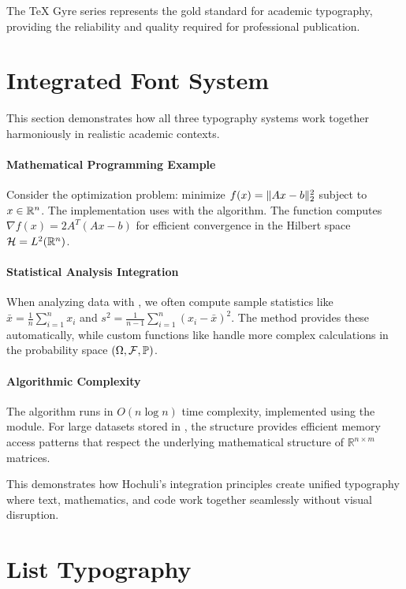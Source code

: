 \documentclass[11pt]{article}
\begin{document}
The TeX Gyre series represents the gold standard for academic typography, providing the reliability and quality required for professional publication.

\section{Integrated Font System}

This section demonstrates how all three typography systems work together harmoniously in realistic academic contexts.

\paragraph{Mathematical Programming Example} Consider the optimization problem: minimize $f(x) = \lVert Ax - b\rVert_2^2$ subject to $x \in \mathbb{R}^n$. 
The implementation uses  with the  algorithm.
The  function computes $\nabla f(x) = 2A^T(Ax - b)$ for efficient convergence in the Hilbert space $\mathcal{H} = L^2(\mathbb{R}^n)$.

\paragraph{Statistical Analysis Integration} When analyzing data with , we often compute sample statistics like $\bar{x} = \frac{1}{n}\sum_{i=1}^n x_i$ and $s^2 = \frac{1}{n-1}\sum_{i=1}^n (x_i - \bar{x})^2$.
The  method provides these automatically, while custom functions like  handle more complex calculations in the probability space $(\Omega, \mathcal{F}, \mathbb{P})$.

\paragraph{Algorithmic Complexity} The algorithm runs in $O(n \log n)$ time complexity, implemented using the  module.
For large datasets stored in , the  structure provides efficient memory access patterns that respect the underlying mathematical structure of $\mathbb{R}^{n \times m}$ matrices.


This demonstrates how Hochuli's integration principles create unified typography where text, mathematics, and code work together seamlessly without visual disruption.

\section{List Typography}
\end{document}
